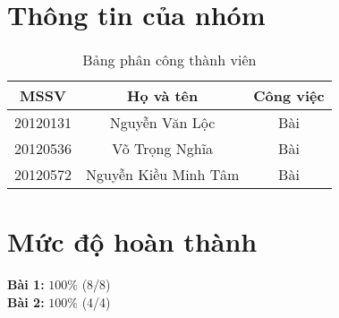 \section{Thông tin của nhóm}
\begin{table}[H]
\begin{center}
\begin{tabular}{|c|c|c|}
\hline 
MSSV & Họ và tên & Công việc \\ 
\hline 
20120131 & Nguyễn Văn Lộc & Bài  \\ 
\hline 
20120536 & Võ Trọng Nghĩa & Bài \\ 
\hline 
20120572 & Nguyễn Kiều Minh Tâm & Bài \\ 
\hline 
\end{tabular}
\caption{Bảng phân công thành viên} 
\end{center}
\end{table}

\section{Mức độ hoàn thành}
\textbf{Bài 1:} $100\%$ (8/8)\\
\textbf{Bài 2:} $100\%$ (4/4)\\
